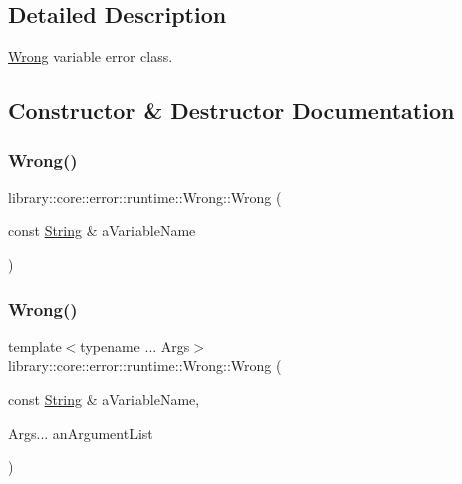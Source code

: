 \subsection{Detailed Description}
\mbox{\hyperlink{classlibrary_1_1core_1_1error_1_1runtime_1_1_wrong}{Wrong}} variable error class. 

\subsection{Constructor \& Destructor Documentation}
\mbox{\label{classlibrary_1_1core_1_1error_1_1runtime_1_1_wrong_acb341a0822b64bfa2d8cdf7963b24f96}} 
\subsubsection{\texorpdfstring{Wrong()}{Wrong()}\hspace{0.1cm}{\footnotesize\ttfamily [1/2]}}
{\footnotesize\ttfamily library\+::core\+::error\+::runtime\+::\+Wrong\+::\+Wrong (\begin{DoxyParamCaption}\item[{const \mbox{\hyperlink{classlibrary_1_1core_1_1types_1_1_string}{String}} \&}]{a\+Variable\+Name }\end{DoxyParamCaption})}

\mbox{\label{classlibrary_1_1core_1_1error_1_1runtime_1_1_wrong_a136f670283ce244b5db8be988db73a73}} 
\subsubsection{\texorpdfstring{Wrong()}{Wrong()}\hspace{0.1cm}{\footnotesize\ttfamily [2/2]}}
{\footnotesize\ttfamily template$<$typename ... Args$>$ \\
library\+::core\+::error\+::runtime\+::\+Wrong\+::\+Wrong (\begin{DoxyParamCaption}\item[{const \mbox{\hyperlink{classlibrary_1_1core_1_1types_1_1_string}{String}} \&}]{a\+Variable\+Name,  }\item[{Args...}]{an\+Argument\+List }\end{DoxyParamCaption})\hspace{0.3cm}{\ttfamily [inline]}}

